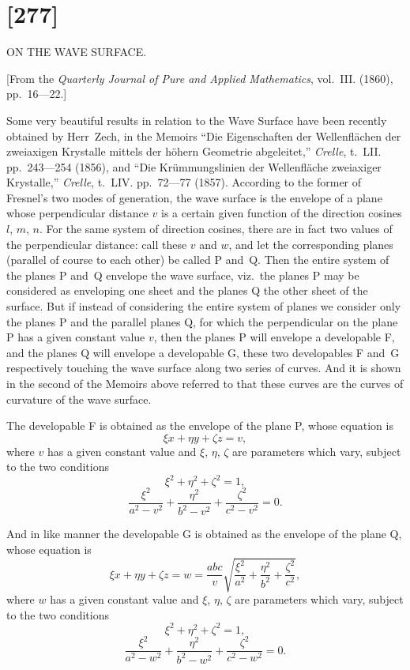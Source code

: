 \documentclass[12pt,a4paper]{article}
\theoremstyle{definition}
\begin{document}
\newpage
\section*{[277]}
\begin{center}
{\large ON THE WAVE SURFACE.}
\end{center}

[From the \textit{Quarterly Journal of Pure and Applied Mathematics}, vol.~III. (1860),
pp.~16---22.]

Some very beautiful results in relation to the Wave Surface have been recently
obtained by Herr~Zech, in the Memoirs ``Die Eigenschaften der Wellenfl\"achen der
zweiaxigen Krystalle mittels der h\"ohern Geometrie abgeleitet,'' \textit{Crelle}, t.~LII.
pp.~243---254 (1856), and ``Die Kr\"ummungslinien der Wellenfl\"ache zweiaxiger
Krystalle,'' \textit{Crelle}, t.~LIV. pp.~72---77 (1857). According to the former of Fresnel's
two modes of generation, the wave surface is the envelope of a plane whose
perpendicular distance $v$ is a certain given function of the direction cosines
$l$, $m$, $n$. For the same system of direction cosines, there are in fact two
values of the perpendicular distance: call these $v$ and $w$, and let the
corresponding planes (parallel of course to each other) be called P and~Q.
Then the entire system of the planes P and~Q envelope the wave surface, viz.\ the
planes P may be considered as enveloping one sheet and the planes Q the other
sheet of the surface. But if instead of considering the entire system of planes we
consider only the planes P and the parallel planes Q, for which the perpendicular on
the plane P has a given constant value $v$, then the planes P will envelope a
developable F, and the planes Q will envelope a developable G, these two
developables F and~G respectively touching the wave surface along two series of
curves. And it is shown in the second of the Memoirs above referred to that these
curves are the curves of curvature of the wave surface.

The developable F is obtained as the envelope of the plane P, whose equation is
\[
\xi x + \eta y + \zeta z = v,
\]
where $v$ has a given constant value and $\xi$, $\eta$, $\zeta$ are parameters which vary,
subject to the two conditions
\[
\xi^{2} + \eta^{2} + \zeta^{2} = 1,
\]
\[
\frac{\xi^{2}}{a^{2} - v^{2}} + \frac{\eta^{2}}{b^{2} - v^{2}} + \frac{\zeta^{2}}{c^{2} - v^{2}} = 0.
\]

And in like manner the developable G is obtained as the envelope of the plane Q,
whose equation is
\[
\xi x + \eta y + \zeta z = w
= \frac{abc}{v}\sqrt{\frac{\xi^{2}}{a^{2}} + \frac{\eta^{2}}{b^{2}} + \frac{\zeta^{2}}{c^{2}}},
\]
where $w$ has a given constant value and $\xi$, $\eta$, $\zeta$ are parameters which vary,
subject to the two conditions
\[
\xi^{2} + \eta^{2} + \zeta^{2} = 1,
\]
\[
\frac{\xi^{2}}{a^{2} - w^{2}} + \frac{\eta^{2}}{b^{2} - w^{2}} + \frac{\zeta^{2}}{c^{2} - w^{2}} = 0.
\]
\end{document}
